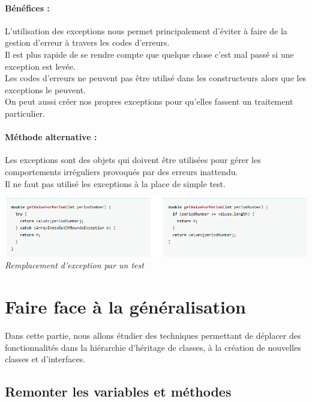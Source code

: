 \documentclass[a4paper,twoside,12pt,openright]{report}
\begin{document}
\paragraph{Bénéfices :}
L'utilisation des exceptions nous permet principalement d'éviter à faire de la gestion d'erreur à travers les codes d'erreurs.\\
Il est plus rapide de se rendre compte que quelque chose c'est mal passé si une exception est levée.\\
Les codes d'erreurs ne peuvent pas être utilisé dans les constructeurs alors que les exceptions le peuvent.\\
On peut aussi créer nos propres exceptions pour qu'elles fassent un traitement particulier.\\

\paragraph{Méthode alternative :}
Les exceptions sont des objets qui doivent être utilisées pour gérer les comportements irréguliers provoqués par des erreurs inattendu.\\
Il ne faut pas utilisé les exceptions à la place de simple test.\\

\begin{center}
\includegraphics[scale=0.75]{Image/ExceptionTest.png}\\
\itshape{Remplacement d'exception par un test \cite{ref5}}
\end{center}

\newpage
\section{Faire face à la généralisation}
Dans cette partie, nous allons étudier des techniques permettant de déplacer des fonctionnalités dans la hiérarchie d'héritage de classes, à la création de nouvelles classes et d'interfaces.\\



\subsection{Remonter les variables et méthodes}
\end{document}
